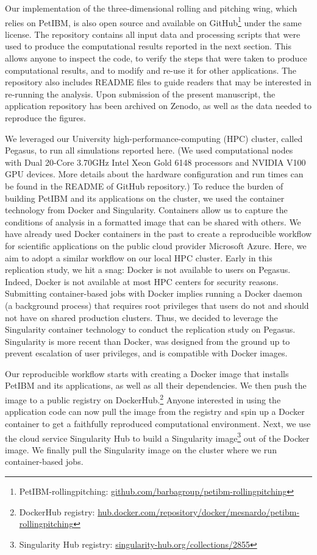 Our implementation of the three-dimensional rolling and pitching wing, which relies on PetIBM, is also open source and available on GitHub\footnote{PetIBM-rollingpitching: \url{github.com/barbagroup/petibm-rollingpitching}} under the same license.
The repository contains all input data and processing scripts that were used to produce the computational results reported in the next section.
This allows anyone to inspect the code, to verify the steps that were taken to produce computational results, and to modify and re-use it for other applications.
The repository also includes \textsc{README} files to guide readers that may be interested in re-running the analysis.
Upon submission of the present manuscript, the application repository has been archived on Zenodo,\supercite{mesnard_barba_2021_zenodo_petibm_app} as well as the data needed to reproduce the figures.\supercite{mesnard_barba_2021_zenodo_repropacks}

We leveraged our University high-performance-computing (HPC) cluster, called Pegasus, to run all simulations reported here.
(We used computational nodes with Dual 20-Core 3.70GHz Intel Xeon Gold 6148 processors and NVIDIA V100 GPU devices. More details about the hardware configuration and run times can be found in the README of GitHub repository.)
To reduce the burden of building PetIBM and its applications on the cluster, we used the container technology from Docker\supercite{merkel_2014} and Singularity.\supercite{kurtzer_et_al_2017}
Containers allow us to capture the conditions of analysis in a formatted image that can be shared with others.
We have already used Docker containers in the past to create a reproducible workflow for scientific applications on the public cloud provider Microsoft Azure.\supercite{mesnard_barba_2020}
Here, we aim to adopt a similar workflow on our local HPC cluster.
Early in this replication study, we hit a snag: Docker is not available to users on Pegasus.
Indeed, Docker is not available at most HPC centers for security reasons.
Submitting container-based jobs with Docker implies running a Docker daemon (a background process) that requires root privileges that users do not and should not have on shared production clusters.
Thus, we decided to leverage the Singularity container technology to conduct the replication study on Pegasus.
Singularity is more recent than Docker, was designed from the ground up to prevent escalation of user privileges, and is compatible with Docker images.

Our reproducible workflow starts with creating a Docker image that installs PetIBM and its applications, as well as all their dependencies.
We then push the image to a public registry on DockerHub.\footnote{DockerHub registry: \url{hub.docker.com/repository/docker/mesnardo/petibm-rollingpitching}}
Anyone interested in using the application code can now pull the image from the registry and spin up a Docker container to get a faithfully reproduced computational environment.
Next, we use the cloud service Singularity Hub to build a Singularity image\footnote{Singularity Hub registry: \url{singularity-hub.org/collections/2855}} out of the Docker image.
We finally pull the Singularity image on the cluster where we run container-based jobs.

